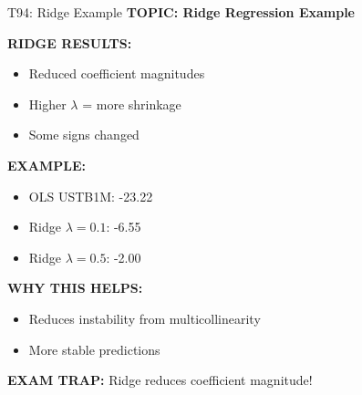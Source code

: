 \documentclass[8pt]{beamer}
\begin{document}
	\begin{frame}{T94: Ridge Example}
		\fontsize{6.5}{7.5}\selectfont
		\textbf{TOPIC: Ridge Regression Example}
		
		\vspace{0.1cm}
		\textbf{RIDGE RESULTS:}
		\begin{itemize}
			\item Reduced coefficient magnitudes
			\item Higher $\lambda$ = more shrinkage
			\item Some signs changed
		\end{itemize}
		
		\vspace{0.1cm}
		\textbf{EXAMPLE:}
		\begin{itemize}
			\item OLS USTB1M: -23.22
			\item Ridge $\lambda=0.1$: -6.55
			\item Ridge $\lambda=0.5$: -2.00
		\end{itemize}
		
		\vspace{0.1cm}
		\textbf{WHY THIS HELPS:}
		\begin{itemize}
			\item Reduces instability from multicollinearity
			\item More stable predictions
		\end{itemize}
		
		\textcolor{myred}{\textbf{EXAM TRAP:}} Ridge \textcolor{myblue}{reduces coefficient magnitude}!
	\end{frame}
	
\end{document}
